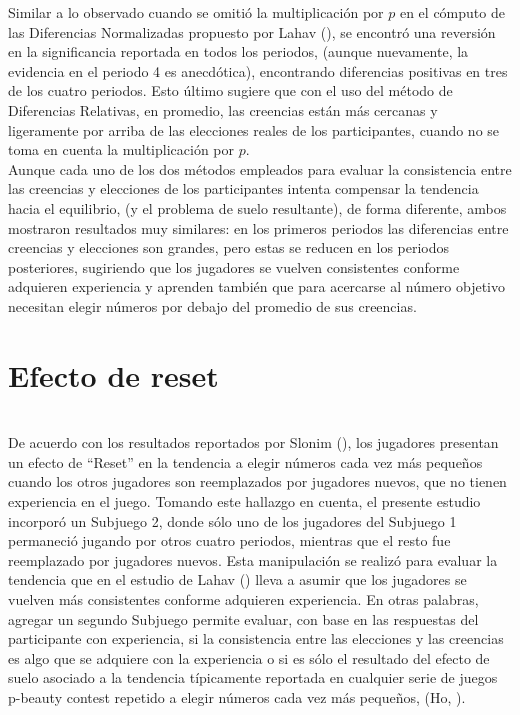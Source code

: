 Similar a lo observado cuando se omitió la multiplicación por $p$ en el cómputo de las Diferencias Normalizadas propuesto por Lahav (\citeyear{Lahav}), se encontró una reversión en la significancia reportada en todos los periodos, (aunque nuevamente, la evidencia en el periodo 4 es anecdótica), encontrando diferencias positivas en tres de los cuatro periodos. Esto último sugiere que con el uso del método de Diferencias Relativas, en promedio, las creencias están más cercanas y ligeramente por arriba de las elecciones reales de los participantes, cuando no se toma en cuenta la multiplicación por $p$.\\

Aunque cada uno de los dos métodos empleados para evaluar la consistencia entre las creencias y elecciones de los participantes intenta compensar la tendencia hacia el equilibrio, (y el problema de suelo resultante), de forma diferente, ambos mostraron resultados muy similares: en los primeros periodos las diferencias entre creencias y elecciones son grandes, pero estas se reducen en los periodos posteriores, sugiriendo que los jugadores se vuelven consistentes conforme adquieren experiencia y aprenden también que para acercarse al número objetivo necesitan elegir números por debajo del promedio de sus creencias.\\

\section{Efecto de reset}\\

De acuerdo con los resultados reportados por Slonim (\citeyear{Slonim}), los jugadores presentan un efecto de ``Reset'' en la tendencia a elegir números cada vez más pequeños cuando los otros jugadores son reemplazados por jugadores nuevos, que no tienen experiencia en el juego. Tomando este hallazgo en cuenta, el presente estudio incorporó un Subjuego 2, donde sólo uno de los jugadores del Subjuego 1 permaneció jugando por otros cuatro periodos, mientras que el resto fue reemplazado por jugadores nuevos. Esta manipulación se realizó para evaluar la tendencia que en el estudio de Lahav (\citeyear{Lahav}) lleva a asumir que los jugadores se vuelven más consistentes conforme adquieren experiencia. En otras palabras, agregar un segundo Subjuego permite evaluar, con base en las respuestas del participante con experiencia, si la consistencia entre las elecciones y las creencias es algo que se adquiere con la experiencia o si es sólo el resultado del efecto de suelo asociado a la tendencia típicamente reportada en cualquier serie de juegos p-beauty contest repetido a elegir números cada vez más pequeños, (Ho, \citeyear{Teck-Hua}).\\

